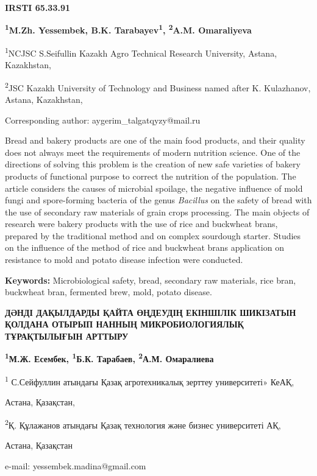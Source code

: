\newpage
{\bfseries IRSTI 65.33.91}


\begin{center}
{\bfseries \textsuperscript{1}M.Zh. Yessembek, B.K. Tarabayev\textsuperscript{1}, \textsuperscript{2}A.M. Omaraliyeva}

\textsuperscript{1}NCJSC S.Seifullin Kazakh Agro Technical Research
University, Astana, Kazakhstan,

\textsuperscript{2}JSC Kazakh University of Technology and Business
named after K. Kulazhanov, Astana, Kazakhstan,

Corresponding author: aygerim\_talgatqyzy@mail.ru
\end{center}

Bread and bakery products are one of the main food products, and their
quality does not always meet the requirements of modern nutrition
science. One of the directions of solving this problem is the creation
of new safe varieties of bakery products of functional purpose to
correct the nutrition of the population. The article considers the
causes of microbial spoilage, the negative influence of mold fungi and
spore-forming bacteria of the genus \emph{Bacillus} on the safety of
bread with the use of secondary raw materials of grain crops processing.
The main objects of research were bakery products with the use of rice
and buckwheat brans, prepared by the traditional method and on complex
sourdough starter. Studies on the influence of the method of rice and
buckwheat brans application on resistance to mold and potato disease
infection were conducted.

{\bfseries Keywords:} Microbiological safety, bread, secondary raw
materials, rice bran, buckwheat bran, fermented brew, mold, potato
disease.

\begin{center}
{\large\bfseries ДӘНДІ ДАҚЫЛДАРДЫ ҚАЙТА ӨҢДЕУДІҢ ЕКІНШІЛІК ШИКІЗАТЫН ҚОЛДАНА
ОТЫРЫП НАННЫҢ МИКРОБИОЛОГИЯЛЫҚ ТҰРАҚТЫЛЫҒЫН АРТТЫРУ}

{\bfseries \textsuperscript{1}М.Ж. Есембек, \textsuperscript{1}Б.К.
Тарабаев, \textsuperscript{2}А.М. Омаралиева}

\textsuperscript{1} С.Сейфуллин атындағы Қазақ агротехникалық зерттеу
университеті» КеАҚ,

Астана, Қазақстан,

\textsuperscript{2}Қ. Құлажанов атындағы Қазақ технология және бизнес
университеті АҚ,

Астана, Қазақстан

e-mail: yessembek.madina@gmail.com
\end{center}

